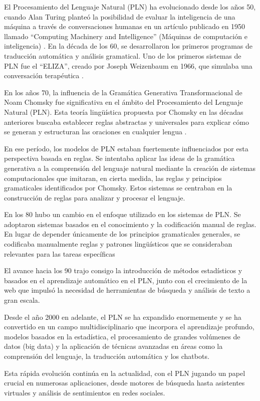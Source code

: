 El Procesamiento del Lenguaje Natural (PLN) ha evolucionado desde los años 50, cuando Alan Turing planteó la posibilidad de evaluar la inteligencia de una máquina a través de conversaciones humanas en un artículo publicado en 1950 llamado ``Computing Machinery and Intelligence'' (Máquinas de computación e inteligencia) \cite{turing2009computing}. En la década de los 60, se desarrollaron los primeros programas de traducción automática y análisis gramatical. Uno de los primeros sistemas de PLN fue el ``ELIZA'', creado por Joseph Weizenbaum en 1966, que simulaba una conversación terapéutica \cite{weizenbaum1966eliza}.

En los años 70, la influencia de la Gramática Generativa Transformacional de Noam Chomsky fue significativa en el ámbito del Procesamiento del Lenguaje Natural (PLN). Esta teoría lingüística propuesta por Chomsky en las décadas anteriores buscaba establecer reglas abstractas y universales para explicar cómo se generan y estructuran las oraciones en cualquier lengua \cite{chomsky1970remarks}.

En ese período, los modelos de PLN estaban fuertemente influenciados por esta perspectiva basada en reglas. Se intentaba aplicar las ideas de la gramática generativa a la comprensión del lenguaje natural mediante la creación de sistemas computacionales que imitaran, en cierta medida, las reglas y principios gramaticales identificados por Chomsky. Estos sistemas se centraban en la construcción de reglas para analizar y procesar el lenguaje.

En los 80 hubo un cambio en el enfoque utilizado en los sistemas de PLN. Se adoptaron sistemas basados en el conocimiento y la codificación manual de reglas. En lugar de depender únicamente de los principios gramaticales generales, se codificaba manualmente reglas y patrones lingüísticos que se consideraban relevantes para las tareas específicas

El avance hacia los 90 trajo consigo la introducción de métodos estadísticos y basados en el aprendizaje automático en el PLN, junto con el crecimiento de la web que impulsó la necesidad de herramientas de búsqueda y análisis de texto a gran escala.

Desde el año 2000 en adelante, el PLN se ha expandido enormemente y se ha convertido en un campo multidisciplinario que incorpora el aprendizaje profundo, modelos basados en la estadística, el procesamiento de grandes volúmenes de datos (big data) y la aplicación de técnicas avanzadas en áreas como la comprensión del lenguaje, la traducción automática y los chatbots.

Esta rápida evolución continúa en la actualidad, con el PLN jugando un papel crucial en numerosas aplicaciones, desde motores de búsqueda hasta asistentes virtuales y análisis de sentimientos en redes sociales.

